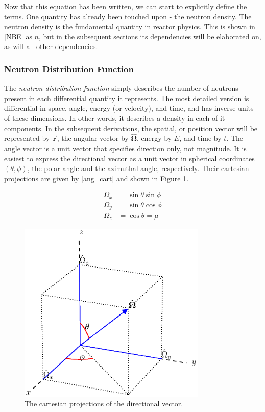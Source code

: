 Now that this equation has been written, we can start to explicitly define the terms.  One quantity has already been touched upon - the neutron density.  The neutron density is the fundamental quantity in reactor physics.  This is shown in \eqref{NBE} as $n$, but in the subsequent sections its dependencies will be elaborated on, as will all other dependencies.


\subsubsection{Neutron Distribution Function}

The \emph{neutron distribution function} simply describes the number of neutrons present in each differential quantity it represents.  The most detailed version is differential in space, angle, energy (or velocity), and time, and has inverse units of these dimensions.  In other words, it describes a density in each of it components.  In the subsequent derivations, the spatial, or position vector will be represented by $\boldsymbol{\vec{r}}$, the angular vector by $\boldsymbol{\hat{\Omega}}$, energy by $E$, and time by $t$.  The angle vector is a unit vector that specifies direction only, not magnitude.  It is easiest to express the directional vector as a unit vector in spherical coordinates $(\theta, \phi)$, the polar angle and the azimuthal angle, respectively.  Their cartesian projections are given by \eqref{ang_cart} and shown in Figure \ref{ang_relations}.

\begin{equation}
\label{ang_cart}
\begin{split}
\Omega_x &= \sin \theta \sin \phi  \\
\Omega_y &= \sin \theta \cos \phi \\
\Omega_z &= \cos \theta = \mu
\end{split}
\end{equation}

\begin{figure}[h!] 
  \centering
    \includegraphics[width=0.8\textwidth , trim= 0cm 2.5cm 0cm 0cm]{graphics/ang_relation.eps} %
     \caption{The cartesian projections of the directional vector. \label{ang_relations}}
\end{figure}

